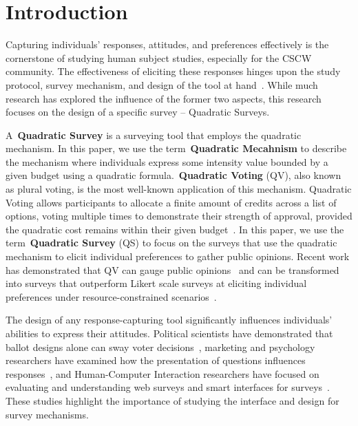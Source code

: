 \section{Introduction}
Capturing individuals' responses, attitudes, and preferences effectively is the cornerstone of studying human subject studies, especially for the CSCW community. The effectiveness of eliciting these responses hinges upon the study protocol, survey mechanism, and design of the tool at hand~\cite{olsonWaysKnowingHCI2014, couperWebSurveyDesign2001, jackoHumancomputerInteractionHandbook2012}. While much research has explored the influence of the former two aspects, this research focuses on the design of a specific survey -- Quadratic Surveys. 


A~\textbf{Quadratic Survey} is a surveying tool that employs the quadratic mechanism. In this paper, we use the term~\textbf{Quadratic Mecahnism} to describe the mechanism where individuals express some intensity value bounded by a given budget using a quadratic formula.~\textbf{Quadratic Voting} (QV), also known as plural voting, is the most well-known application of this mechanism. Quadratic Voting allows participants to allocate a finite amount of credits across a list of options, voting multiple times to demonstrate their strength of approval, provided the quadratic cost remains within their given budget~\cite{lalley2018quadratic}. In this paper, we use the term~\textbf{Quadratic Survey} (QS) to focus on the surveys that use the quadratic mechanism to elicit individual preferences to gather public opinions. Recent work has demonstrated that QV can gauge public opinions~\cite{quarfoot2017quadratic} and can be transformed into surveys that outperform Likert scale surveys at eliciting individual preferences under resource-constrained scenarios~\cite{chengCanShowWhat2021}. 

The design of any response-capturing tool significantly influences individuals' abilities to express their attitudes. Political scientists have demonstrated that ballot designs alone can sway voter decisions~\cite{engstrom2020politics}, marketing and psychology researchers have examined how the presentation of questions influences responses~\cite{weijtersEffectRatingScale2010, kierujVariationsResponseStyle2010, toepoelSmileysStarsHearts2019}, and Human-Computer Interaction researchers have focused on evaluating and understanding web surveys and smart interfaces for surveys~\cite{farzandAestheticsEvaluatingResponse2024, xiaoTellMeYourself2020, pielotDidYouMisclick2024}. These studies highlight the importance of studying the interface and design for survey mechanisms.

